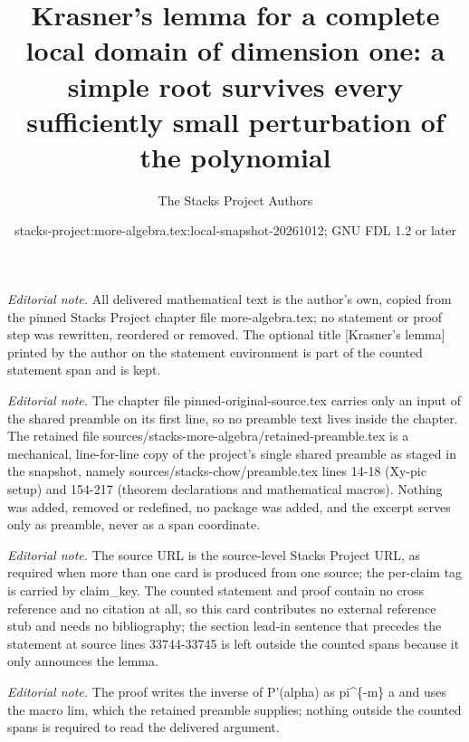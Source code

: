\documentclass[10pt,a4paper]{amsart}
\title{Krasner's lemma for a complete local domain of dimension one: a simple root survives every sufficiently small perturbation of the polynomial}
\author{The Stacks Project Authors}
\date{stacks-project:more-algebra.tex:local-snapshot-20261012; GNU FDL 1.2 or later}
\theoremstyle{plain}
\theoremstyle{definition}
\theoremstyle{remark}
\numberwithin{equation}{subsection}
\begin{document}
\maketitle
\setcounter{subsection}{1}
\noindent\textit{Editorial note.} All delivered mathematical text is the author's own, copied from the pinned Stacks Project chapter file more-algebra.tex; no statement or proof step was rewritten, reordered or removed. The optional title [Krasner's lemma] printed by the author on the statement environment is part of the counted statement span and is kept.\par\medskip
\noindent\textit{Editorial note.} The chapter file pinned-original-source.tex carries only an input of the shared preamble on its first line, so no preamble text lives inside the chapter. The retained file sources/stacks-more-algebra/retained-preamble.tex is a mechanical, line-for-line copy of the project's single shared preamble as staged in the snapshot, namely sources/stacks-chow/preamble.tex lines 14-18 (Xy-pic setup) and 154-217 (theorem declarations and mathematical macros). Nothing was added, removed or redefined, no package was added, and the excerpt serves only as preamble, never as a span coordinate.\par\medskip
\noindent\textit{Editorial note.} The source URL is the source-level Stacks Project URL, as required when more than one card is produced from one source; the per-claim tag is carried by claim\_key. The counted statement and proof contain no cross reference and no citation at all, so this card contributes no external reference stub and needs no bibliography; the section lead-in sentence that precedes the statement at source lines 33744-33745 is left outside the counted spans because it only announces the lemma.\par\medskip
\noindent\textit{Editorial note.} The proof writes the inverse of P'(alpha) as pi\textasciicircum{}\{-m\} a and uses the macro lim, which the retained preamble supplies; nothing outside the counted spans is required to read the delivered argument.\par\medskip
\end{document}

